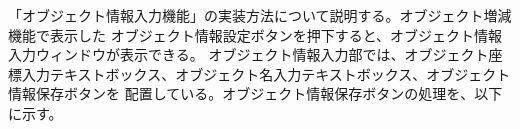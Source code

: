 

「オブジェクト情報入力機能」の実装方法について説明する。オブジェクト増減機能で表示した
オブジェクト情報設定ボタンを押下すると、オブジェクト情報入力ウィンドウが表示できる。
オブジェクト情報入力部では、オブジェクト座標入力テキストボックス、オブジェクト名入力テキストボックス、オブジェクト情報保存ボタンを
配置している。オブジェクト情報保存ボタンの処理を、以下に示す。



